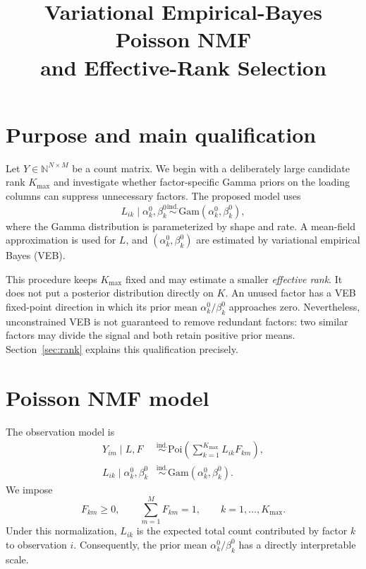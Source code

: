 \documentclass[11pt]{article}
\title{Variational Empirical-Bayes Poisson NMF\\
and Effective-Rank Selection}
\author{}
\date{}
\newcommand{\N}{\mathbb{N}}
\newcommand{\Poi}{\mathrm{Poi}}
\newcommand{\Gam}{\mathrm{Gam}}
\begin{document}
\maketitle

\section{Purpose and main qualification}

Let $Y\in\N^{N\times M}$ be a count matrix.  We begin with a deliberately
large candidate rank $K_{\max}$ and investigate whether factor-specific Gamma
priors on the loading columns can suppress unnecessary factors.  The proposed
model uses
\[
  L_{ik}\mid \alpha_k^0,\beta_k^0
  \overset{\mathrm{ind.}}{\sim}
  \Gam(\alpha_k^0,\beta_k^0),
\]
where the Gamma distribution is parameterized by shape and rate.  A
mean-field approximation is used for $L$, and $(\alpha_k^0,\beta_k^0)$ are
estimated by variational empirical Bayes (VEB).

This procedure keeps $K_{\max}$ fixed and may estimate a smaller
\emph{effective rank}.  It does not put a posterior distribution directly on
$K$.  An unused factor has a VEB fixed-point direction in which its prior mean
$\alpha_k^0/\beta_k^0$ approaches zero.  Nevertheless, unconstrained VEB is
not guaranteed to remove redundant factors: two similar factors may divide
the signal and both retain positive prior means.  Section~\ref{sec:rank}
explains this qualification precisely.


\section{Poisson NMF model}

The observation model is
\begin{align}
  Y_{im}\mid L,F
  &\overset{\mathrm{ind.}}{\sim}
  \Poi\!\left(\sum_{k=1}^{K_{\max}}L_{ik}F_{km}\right),
  \label{eq:observation-model}\\
  L_{ik}\mid\alpha_k^0,\beta_k^0
  &\overset{\mathrm{ind.}}{\sim}
  \Gam(\alpha_k^0,\beta_k^0).
  \label{eq:loading-prior}
\end{align}
We impose
\begin{equation}
  F_{km}\geq 0,
  \qquad
  \sum_{m=1}^M F_{km}=1,
  \qquad k=1,\ldots,K_{\max}.
  \label{eq:F-normalization}
\end{equation}
Under this normalization, $L_{ik}$ is the expected total count contributed by
factor $k$ to observation $i$.  Consequently, the prior mean
$\alpha_k^0/\beta_k^0$ has a directly interpretable scale.
\end{document}
